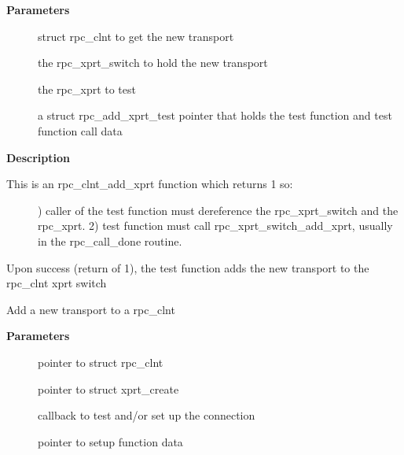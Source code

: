 \documentclass[a4paper,8pt,english]{sphinxmanual}
\begin{document}
\textbf{Parameters}
\begin{description}
\item[{}] \leavevmode
struct rpc\_clnt to get the new transport

\item[{}] \leavevmode
the rpc\_xprt\_switch to hold the new transport

\item[{}] \leavevmode
the rpc\_xprt to test

\item[{}] \leavevmode
a struct rpc\_add\_xprt\_test pointer that holds the test function
and test function call data

\end{description}

\textbf{Description}
\begin{description}
\item[{This is an rpc\_clnt\_add\_xprt  function which returns 1 so:}] ) caller of the test function must dereference the rpc\_xprt\_switch
and the rpc\_xprt.
2) test function must call rpc\_xprt\_switch\_add\_xprt, usually in
the rpc\_call\_done routine.

\end{description}

Upon success (return of 1), the test function adds the new
transport to the rpc\_clnt xprt switch

\begin{fulllineitems}
\label{networking/kapi:c.rpc_clnt_add_xprt}
Add a new transport to a rpc\_clnt

\end{fulllineitems}


\textbf{Parameters}
\begin{description}
\item[{}] \leavevmode
pointer to struct rpc\_clnt

\item[{}] \leavevmode
pointer to struct xprt\_create

\item[{}] \leavevmode
callback to test and/or set up the connection

\item[{}] \leavevmode
pointer to setup function data

\end{description}
\end{document}
